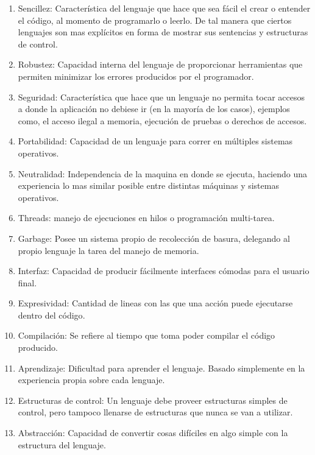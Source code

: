 \documentclass[a4paper,12pt,openany,oneside]{book}
\begin{document}
\begin{enumerate}

\item Sencillez: Característica del lenguaje que hace que sea fácil el crear o entender el código, al momento de programarlo o leerlo. De tal manera que ciertos lenguajes son mas explícitos en forma de mostrar sus sentencias y estructuras de control\cite{data4}.

\item Robustez: Capacidad interna del lenguaje de proporcionar herramientas que permiten minimizar los errores producidos por el programador\cite{data4}.

\item Seguridad: Característica que hace que un lenguaje no permita tocar accesos a donde la aplicación no debiese ir (en la mayoría de los casos), ejemplos como, el acceso ilegal a memoria, ejecución de pruebas o derechos de accesos\cite{data4}.

\item Portabilidad: Capacidad de un lenguaje para correr en múltiples sistemas operativos\cite{data4}.

\item Neutralidad: Independencia de la maquina en donde se ejecuta, haciendo una experiencia lo mas similar posible entre distintas máquinas y sistemas operativos\cite{data4}.

\item Threads: manejo de ejecuciones en hilos o programación multi-tarea\cite{data4}.

\item Garbage: Posee un sistema propio de recolección de basura, delegando al propio lenguaje la tarea del manejo de memoria\cite{data4}.

\item Interfaz: Capacidad de producir fácilmente interfaces cómodas para el usuario final\cite{data4}.

\item Expresividad: Cantidad de lineas con las que una acción puede ejecutarse dentro del código\cite{data5}.

\item Compilación: Se refiere al tiempo que toma poder compilar el código producido.

\item Aprendizaje: Dificultad para aprender el lenguaje. Basado simplemente en la experiencia propia sobre cada lenguaje.

\item Estructuras de control: Un lenguaje debe proveer estructuras simples de control, pero tampoco llenarse de estructuras que nunca se van a utilizar\cite{data6}.

\item Abstracción: Capacidad de convertir cosas difíciles en algo simple con la estructura del lenguaje\cite{data6}.

\end{enumerate}
\end{document}
